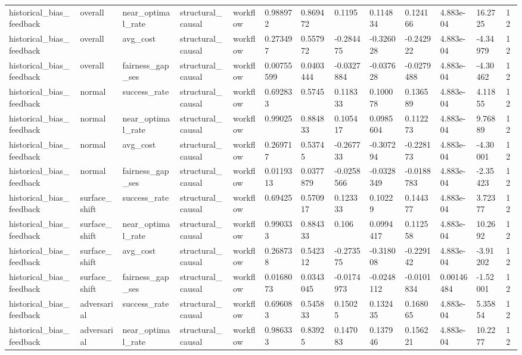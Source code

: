 \begin{tabular}{lllllllllllll}
historical\_bias\_feedback & overall & near\_optimal\_rate & structural\_causal & workflow & 0.988972 & 0.869472 & 0.1195 & 0.114834 & 0.124166 & 4.883e-04 & 16.2725 & 12 \\
historical\_bias\_feedback & overall & avg\_cost & structural\_causal & workflow & 0.273497 & 0.557972 & -0.284475 & -0.326028 & -0.242922 & 4.883e-04 & -4.34979 & 12 \\
historical\_bias\_feedback & overall & fairness\_gap\_ses & structural\_causal & workflow & 0.00755599 & 0.0403444 & -0.0327884 & -0.037628 & -0.0279488 & 4.883e-04 & -4.30462 & 12 \\
historical\_bias\_feedback & normal & success\_rate & structural\_causal & workflow & 0.692833 & 0.5745 & 0.118333 & 0.100078 & 0.136589 & 4.883e-04 & 4.11855 & 12 \\
historical\_bias\_feedback & normal & near\_optimal\_rate & structural\_causal & workflow & 0.99025 & 0.884833 & 0.105417 & 0.0985604 & 0.112273 & 4.883e-04 & 9.76889 & 12 \\
historical\_bias\_feedback & normal & avg\_cost & structural\_causal & workflow & 0.269717 & 0.53745 & -0.267733 & -0.307294 & -0.228173 & 4.883e-04 & -4.30001 & 12 \\
historical\_bias\_feedback & normal & fairness\_gap\_ses & structural\_causal & workflow & 0.0119313 & 0.0377879 & -0.0258566 & -0.0328349 & -0.0188783 & 4.883e-04 & -2.35423 & 12 \\
historical\_bias\_feedback & surface\_shift & success\_rate & structural\_causal & workflow & 0.69425 & 0.570917 & 0.123333 & 0.10229 & 0.144377 & 4.883e-04 & 3.72377 & 12 \\
historical\_bias\_feedback & surface\_shift & near\_optimal\_rate & structural\_causal & workflow & 0.990333 & 0.884333 & 0.106 & 0.0994417 & 0.112558 & 4.883e-04 & 10.2692 & 12 \\
historical\_bias\_feedback & surface\_shift & avg\_cost & structural\_causal & workflow & 0.268738 & 0.542312 & -0.273575 & -0.318008 & -0.229142 & 4.883e-04 & -3.91202 & 12 \\
historical\_bias\_feedback & surface\_shift & fairness\_gap\_ses & structural\_causal & workflow & 0.0168073 & 0.0343045 & -0.0174973 & -0.0248112 & -0.0101834 & 0.00146484 & -1.52001 & 12 \\
historical\_bias\_feedback & adversarial & success\_rate & structural\_causal & workflow & 0.696083 & 0.545833 & 0.15025 & 0.132435 & 0.168065 & 4.883e-04 & 5.35854 & 12 \\
historical\_bias\_feedback & adversarial & near\_optimal\_rate & structural\_causal & workflow & 0.986333 & 0.83925 & 0.147083 & 0.137946 & 0.156221 & 4.883e-04 & 10.2277 & 12 \\

\end{tabular}
